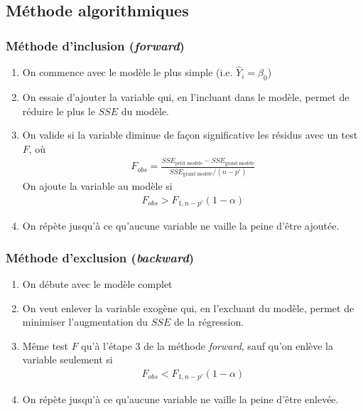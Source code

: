 \documentclass[10pt, french]{article}
\begin{document}
\begin{multicols*}{3}
\subsection*{Méthode algorithmiques}

\subsubsection*{Méthode d'inclusion (\textit{forward})}
\begin{enumerate}
\item On commence avec le modèle le plus simple (i.e. $\hat{Y}_i = \beta_0$)
\item On essaie d'ajouter la variable qui, en l'incluant dans le modèle, permet de réduire le plus le $SSE$ du modèle.
\item On valide si la variable diminue de façon significative les résidus avec un test $F$, où
\begin{align*}
F_{obs} = \frac{SSE_{\text{petit modèle}} - SSE_{\text{grand modèle}}}{SSE_{\text{grand modèle}} / (n-p')}
\end{align*}
On ajoute la variable au modèle si
\begin{align*}
F_{obs} > F_{1, n-p'}(1 - \alpha)
\end{align*}
\item On répète jusqu'à ce qu'aucune variable ne vaille la peine d'être ajoutée.
\end{enumerate}


\subsubsection*{Méthode d'exclusion (\textit{backward})}
\begin{enumerate}
\item On débute avec le modèle complet
\item On veut enlever la variable exogène qui, en l'excluant du modèle, permet de minimiser l'augmentation du $SSE$ de la régression.
\item Même test $F$ qu'à l'étape 3 de la méthode \textit{forward}, sauf qu'on enlève la variable seulement si
\begin{align*}
F_{obs} < F_{1, n-p'}(1-\alpha)
\end{align*}
\item On répète jusqu'à ce qu'aucune variable ne vaille la peine d'être enlevée.
\end{enumerate}



\end{multicols*}
\end{document}
